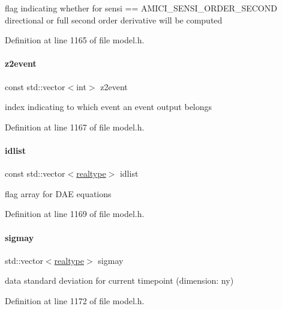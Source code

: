flag indicating whether for sensi == A\+M\+I\+C\+I\+\_\+\+S\+E\+N\+S\+I\+\_\+\+O\+R\+D\+E\+R\+\_\+\+S\+E\+C\+O\+ND directional or full second order derivative will be computed 

Definition at line 1165 of file model.\+h.

\mbox{\label{classamici_1_1_model_af3343032542edf755502ca03f125a3e4}} 
\paragraph{\texorpdfstring{z2event}{z2event}}
{\footnotesize\ttfamily const std\+::vector$<$int$>$ z2event}

index indicating to which event an event output belongs 

Definition at line 1167 of file model.\+h.

\mbox{\label{classamici_1_1_model_a3eadbed11a3c95f9d046633151414420}} 
\paragraph{\texorpdfstring{idlist}{idlist}}
{\footnotesize\ttfamily const std\+::vector$<$\mbox{\hyperlink{namespaceamici_a1bdce28051d6a53868f7ccbf5f2c14a3}{realtype}}$>$ idlist}

flag array for D\+AE equations 

Definition at line 1169 of file model.\+h.

\mbox{\label{classamici_1_1_model_a7dc280c0479f4a1fffe67fea251c26d2}} 
\paragraph{\texorpdfstring{sigmay}{sigmay}}
{\footnotesize\ttfamily std\+::vector$<$\mbox{\hyperlink{namespaceamici_a1bdce28051d6a53868f7ccbf5f2c14a3}{realtype}}$>$ sigmay}

data standard deviation for current timepoint (dimension\+: ny) 

Definition at line 1172 of file model.\+h.

\mbox{\label{classamici_1_1_model_ac27fda47fffca46aa720e7df432edab4}} 
